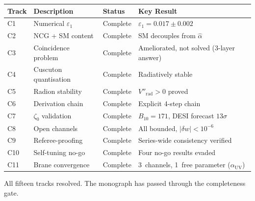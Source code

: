 \begin{center}
\begin{tabular}{l l l l}
\hline
Track & Description & Status & Key Result \\
\hline
C1 & Numerical $\varepsilon_1$ & Complete & $\varepsilon_1 = 0.017 \pm 0.002$ \\
C2 & NCG + SM content & Complete & SM decouples from $\hat{\alpha}$ \\
C3 & Coincidence problem & Complete & Ameliorated, not solved (3-layer answer) \\
C4 & Cuscuton quantisation & Complete & Radiatively stable \\
C5 & Radion stability & Complete & $V''_{\mathrm{rad}} > 0$ proved \\
C6 & Derivation chain & Complete & Explicit 4-step chain \\
C7 & $\zeta_0$ validation & Complete & $B_{10} = 171$, DESI forecast $13\sigma$ \\
C8 & Open channels & Complete & All bounded, $|\delta w| < 10^{-6}$ \\
C9 & Referee-proofing & Complete & Series-wide consistency verified \\
C10 & Self-tuning no-go & Complete & Four no-go results evaded \\
C11 & Brane convergence & Complete & 3~channels, 1~free parameter ($\alpha_{\mathrm{UV}}$) \\
\hline
\end{tabular}
\end{center}

\noindent
All fifteen tracks resolved. The monograph has passed through the completeness gate.

